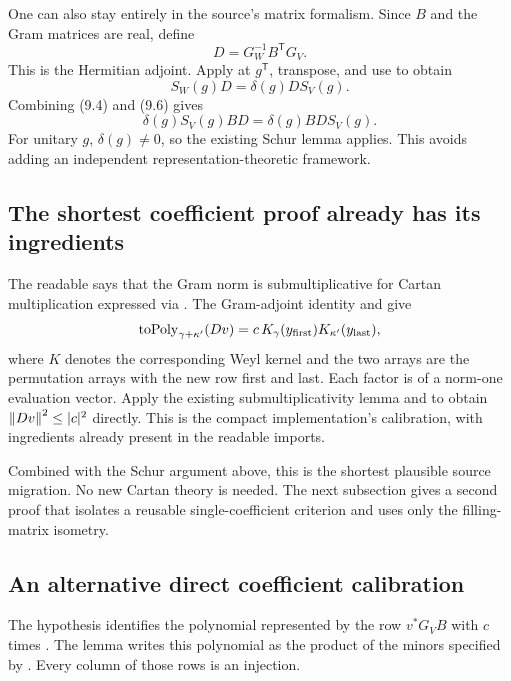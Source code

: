 One can also stay entirely in the source's matrix formalism. Since \(B\)
and the Gram matrices are real, define
\begin{equation}
 D=G_W^{-1}B^{\mathsf T}G_V.
\end{equation}
This is the Hermitian adjoint. Apply  at \(g^{\mathsf T}\),
transpose, and use
 to obtain
\begin{equation}
 S_W(g)D=\delta(g)D S_V(g).
\end{equation}
Combining (9.4) and (9.6) gives
\begin{equation}
 \delta(g)S_V(g)BD=\delta(g)BD S_V(g).
\end{equation}
For unitary \(g\), \(\delta(g)\ne0\), so the existing Schur lemma applies.
This avoids adding an independent representation-theoretic framework.

\subsection{The shortest coefficient proof already has its ingredients}

The readable
says that the Gram norm is submultiplicative for Cartan multiplication
expressed via . The Gram-adjoint identity and  give
\[
 \operatorname{toPoly}_{\gamma+\kappa'}(Dv)
   =c\,K_\gamma(y_{\rm first})K_{\kappa'}(y_{\rm last}),
\]
where \(K\) denotes the corresponding Weyl kernel and the two arrays are
the permutation arrays with the new row first and last.
Each factor is  of a norm-one evaluation vector.
Apply the existing submultiplicativity lemma and
 to obtain
\(\left\lVert Dv\right\rVert^2\le|c|^2\) directly.
This is the compact implementation's calibration, with ingredients
already present in the readable imports.

Combined with the Schur argument above, this is the shortest plausible
source migration. No new Cartan theory is needed. The next subsection
gives a second proof that isolates a reusable single-coefficient
criterion and uses only the filling-matrix isometry.

\subsection{An alternative direct coefficient calibration}

The hypothesis  identifies the polynomial represented by
the row \(v^*G_VB\) with \(c\) times .
The lemma  writes this polynomial
as the product of the minors specified by .
Every column of those rows is an injection.

